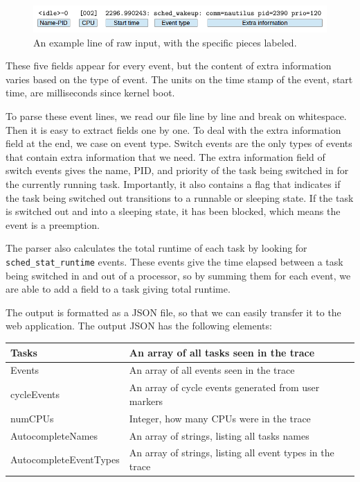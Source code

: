 \documentclass{hmcclinic}
\begin{document}
  \begin{figure}
  \includegraphics[scale=0.4]{parserExample.png}
  \caption{An example line of raw input, with the specific pieces labeled.}
  \end{figure}

  These five fields appear for every event, but the content of extra information
  varies based on the type of event. The units on the time stamp of the event,
  start time, are milliseconds since kernel boot.

  To parse these event lines, we read our file line by line and break on
  whitespace. Then it is easy to extract fields one by one. To deal with the
  extra information field at the end, we case on event type. Switch events
  are the only types of events that contain extra information that we need.  The
  extra information field of switch events gives the name, PID, and priority of
  the task being switched in for the currently running task. Importantly, it
  also contains a flag that indicates if the task being switched out transitions
  to a runnable or sleeping state. If the task is switched out and into a
  sleeping state, it has been blocked, which means the event is a preemption.

  The parser also calculates the total runtime of each task by looking for
\texttt{sched\_stat\_runtime} events. These events give the time elapsed between
  a task being switched in and out of a processor, so by summing them for 
  each event, we are able to add a field to a task giving total runtime.

  The output is formatted as a JSON file, so that we can easily transfer it to
  the web application. The output JSON has the following elements:

  \begin{center}
    \begin{tabular}{|l|l|}
      \hline
      Tasks      & An array of all tasks seen in the trace\\
      \hline
      Events     & An array of all events seen in the trace\\
      \hline
      cycleEvents & An array of cycle events generated from user markers\\
      \hline
      numCPUs     & Integer, how many CPUs were in the trace\\
      \hline
      AutocompleteNames & An array of strings, listing all tasks names\\
      \hline
      AutocompleteEventTypes & An array of strings, listing all event types in
      the trace\\
      \hline
    \end{tabular}
  \end{center}
\end{document}

